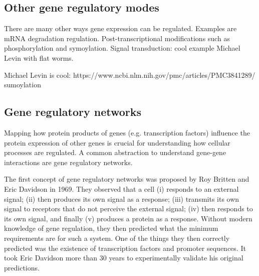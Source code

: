 \subsection{Other gene regulatory modes}

There are many other ways gene expression can be regulated. Examples are mRNA degradation regulation. Post-transcriptional modifications such as phosphorylation and symoylation. Signal transduction: cool example Michael Levin with flat worms.

Michael Levin is cool: https://www.ncbi.nlm.nih.gov/pmc/articles/PMC3841289/
sumoylation

\subsection{Gene regulatory networks}

Mapping how protein products of genes (e.g. transcription factors) influence the protein expression of other genes is crucial for understanding how cellular processes are regulated. A common abstraction to understand gene-gene interactions are gene regulatory networks.

The first concept of gene regulatory networks was proposed by Roy Britten and Eric Davidson in 1969\cite{Britten_1969}. They observed that a cell (i) responds to an external signal; (ii) then produces its own signal as a response; (iii) transmits its own signal to receptors that do not perceive the external signal; (iv) then responds to its own signal, and finally (v) produces a protein as a response. Without modern knowledge of gene regulation, they then predicted what the minimum requirements are for such a system. One of the things they then correctly predicted was the existence of transcription factors and promoter sequences. It took Eric Davidson more than 30 years to experimentally validate his original predictions\cite{Davidson_2002}.

